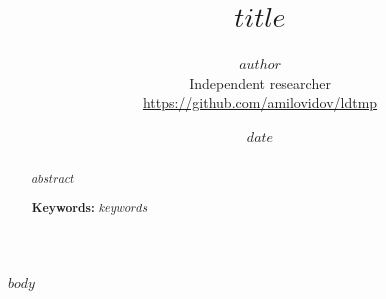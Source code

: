 \documentclass[11pt]{article}
\title{$title$}
\author{$author$\\[2pt]\small Independent researcher\\\small\url{https://github.com/amilovidov/ldtmp}}
\date{$date$}
\begin{document}
\maketitle
\thispagestyle{empty}

\begin{abstract}
$abstract$

\medskip
\noindent\textbf{Keywords:} $keywords$
\end{abstract}

$body$
\end{document}
